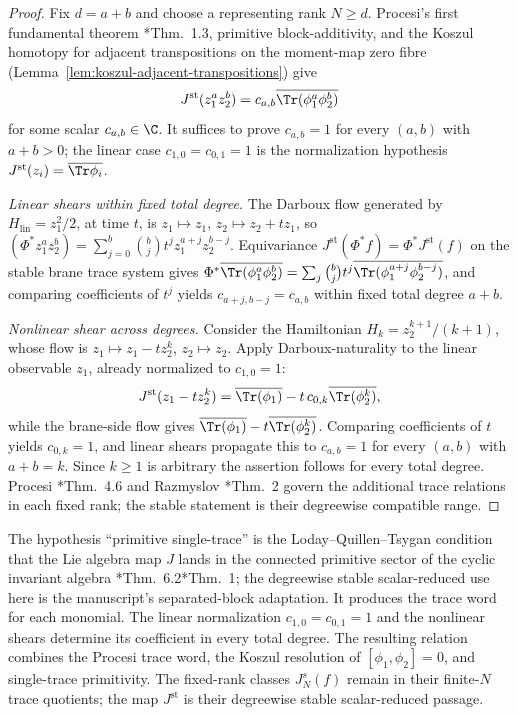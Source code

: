 \begin{proof}
Fix \(d=a+b\) and choose a representing rank \(N\geq d\).
Procesi's first fundamental theorem \cite{procesi}*{Thm.~1.3},
primitive block-additivity, and the Koszul homotopy for adjacent
transpositions on the moment-map zero fibre
(Lemma~\ref{lem:koszul-adjacent-transpositions}) give
\[
  J^{\mathrm{st}}(z_1^az_2^b)
  =c_{a,b}\overline{\Tr(\phi_1^a\phi_2^b)}
\]
for some scalar \(c_{a,b}\in\C\).  It suffices to prove
\(c_{a,b}=1\) for every \((a,b)\) with \(a+b>0\); the linear case
\(c_{1,0}=c_{0,1}=1\) is the normalization hypothesis
\(J^{\mathrm{st}}(z_i)=\overline{\Tr\phi_i}\).

\emph{Linear shears within fixed total degree.}  The Darboux flow
generated by \(H_{\mathrm{lin}}=z_1^2/2\), at time \(t\), is
\(z_1\mapsto z_1\), \(z_2\mapsto z_2+tz_1\), so
\((\Phi^*z_1^az_2^b)=\sum_{j=0}^b\binom{b}{j}t^jz_1^{a+j}z_2^{b-j}\).
Equivariance
\(J^{\mathrm{st}}(\Phi^*f)=\Phi^*J^{\mathrm{st}}(f)\) on the
stable brane trace system gives
\(\Phi^*\overline{\Tr(\phi_1^a\phi_2^b)}=\sum_{j}\binom{b}{j}t^j
\overline{\Tr(\phi_1^{a+j}\phi_2^{b-j})}\), and comparing
coefficients of \(t^j\) yields
\(c_{a+j,b-j}=c_{a,b}\) within fixed total degree \(a+b\).

\emph{Nonlinear shear across degrees.}  Consider the Hamiltonian
\(H_k=z_2^{k+1}/(k+1)\), whose flow is
\(z_1\mapsto z_1-tz_2^k\), \(z_2\mapsto z_2\).  Apply
Darboux-naturality to the linear observable \(z_1\), already
normalized to \(c_{1,0}=1\):
\[
  J^{\mathrm{st}}(z_1-tz_2^k)
  =\overline{\Tr(\phi_1)}
  -t\,c_{0,k}\overline{\Tr(\phi_2^k)} ,
\]
while the brane-side flow gives
\(\overline{\Tr(\phi_1)}-t\overline{\Tr(\phi_2^k)}\).  Comparing
coefficients of \(t\) yields \(c_{0,k}=1\), and linear shears
propagate this to \(c_{a,b}=1\) for every \((a,b)\) with \(a+b=k\).
Since \(k\ge 1\) is arbitrary the assertion follows for every total
degree.  Procesi \cite{procesi}*{Thm.~4.6} and Razmyslov
\cite{razmyslov}*{Thm.~2} govern the additional trace relations in
each fixed rank; the stable statement is their degreewise compatible
range.
\end{proof}

\begin{rmk}
\label{rmk:completion-multiplicativity-relation}
The hypothesis ``primitive single-trace'' is the
Loday--Quillen--Tsygan condition that the Lie algebra map \(J\) lands
in the connected primitive sector of the cyclic invariant algebra
\cite{loday-quillen}*{Thm.~6.2}\cite{tsygan}*{Thm.~1}; the
degreewise stable scalar-reduced use here is the manuscript's
separated-block adaptation.  It produces the trace word for each
monomial.  The linear normalization
\(c_{1,0}=c_{0,1}=1\) and the nonlinear shears determine its
coefficient in every total degree.  The resulting relation combines
the Procesi trace word, the Koszul resolution of
\([\phi_1,\phi_2]=0\), and single-trace primitivity.  The fixed-rank
classes \(J_N^s(f)\) remain in their finite-\(N\) trace quotients;
the map \(J^{\mathrm{st}}\) is their degreewise stable scalar-reduced
passage.
\end{rmk}

